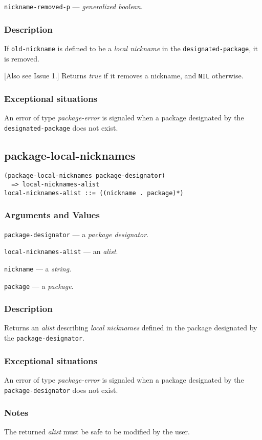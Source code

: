 \documentclass[11pt]{article}
\begin{document}
\texttt{nickname-removed-p} --- \emph{generalized boolean}.
\subsubsection{Description}
\label{sec:org5c85def}
If \texttt{old-nickname} is defined to be a \emph{local nickname} in the \texttt{designated-package},
it is removed.

[Also see Issue 1.] Returns \emph{true} if it removes a nickname, and \texttt{NIL} otherwise.
\subsubsection{Exceptional situations}
\label{sec:org180d816}
An error of type \emph{package-error} is signaled when a package designated by the
\texttt{designated-package} does not exist.
\subsection{package-local-nicknames}
\label{sec:org809055a}
\begin{verbatim}
(package-local-nicknames package-designator)
  => local-nicknames-alist
local-nicknames-alist ::= ((nickname . package)*)
\end{verbatim}
\subsubsection{Arguments and Values}
\label{sec:orgccf2e43}
\texttt{package-designator} --- a \emph{package designator}.

\texttt{local-nicknames-alist} --- an \emph{alist}.

\texttt{nickname} --- a \emph{string}.

\texttt{package} --- a \emph{package}.
\subsubsection{Description}
\label{sec:org463c123}
Returns an \emph{alist} describing \emph{local nicknames} defined in the package designated
by the \texttt{package-designator}.
\subsubsection{Exceptional situations}
\label{sec:orgf522285}
An error of type \emph{package-error} is signaled when a package designated by the
\texttt{package-designator} does not exist.
\subsubsection{Notes}
\label{sec:org03604f3}
The returned \emph{alist} must be safe to be modified by the user.
\end{document}

